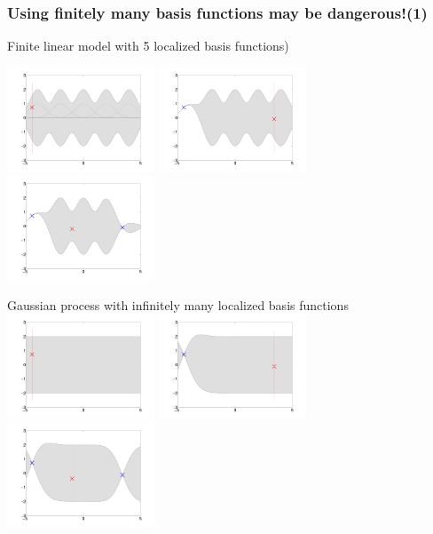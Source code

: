 \begin{frame}
\frametitle{\!\!\!Using finitely many basis functions may be dangerous!(1)}

Finite linear model with 5 localized basis functions)

\includegraphics[width=0.33\textwidth]{seq_linear_M1.pdf}
\includegraphics[width=0.33\textwidth]{seq_linear_M2.pdf}
\includegraphics[width=0.33\textwidth]{seq_linear_M3.pdf}

Gaussian process with infinitely many localized basis functions
\includegraphics[width=0.33\textwidth]{seq_fullGP_M1.pdf}
\includegraphics[width=0.33\textwidth]{seq_fullGP_M2.pdf}
\includegraphics[width=0.33\textwidth]{seq_fullGP_M3.pdf}
\end{frame}

